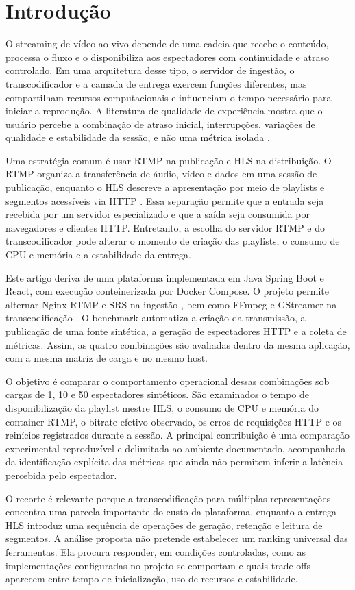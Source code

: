 \section{Introdução}

O streaming de vídeo ao vivo depende de uma cadeia que recebe o conteúdo, processa o fluxo e o disponibiliza aos espectadores com continuidade e atraso controlado. Em uma arquitetura desse tipo, o servidor de ingestão, o transcodificador e a camada de entrega exercem funções diferentes, mas compartilham recursos computacionais e influenciam o tempo necessário para iniciar a reprodução. A literatura de qualidade de experiência mostra que o usuário percebe a combinação de atraso inicial, interrupções, variações de qualidade e estabilidade da sessão, e não uma métrica isolada \citep{seufert,barman,rfc9317}.

Uma estratégia comum é usar RTMP na publicação e HLS na distribuição. O RTMP organiza a transferência de áudio, vídeo e dados em uma sessão de publicação, enquanto o HLS descreve a apresentação por meio de playlists e segmentos acessíveis via HTTP \citep{rtmp,hls}. Essa separação permite que a entrada seja recebida por um servidor especializado e que a saída seja consumida por navegadores e clientes HTTP. Entretanto, a escolha do servidor RTMP e do transcodificador pode alterar o momento de criação das playlists, o consumo de CPU e memória e a estabilidade da entrega.

Este artigo deriva de uma plataforma implementada em Java Spring Boot e React, com execução conteinerizada por Docker Compose. O projeto permite alternar Nginx-RTMP e SRS na ingestão \citep{nginxrtmp,srs}, bem como FFmpeg e GStreamer na transcodificação \citep{ffmpeg,gstreamer}. O benchmark automatiza a criação da transmissão, a publicação de uma fonte sintética, a geração de espectadores HTTP e a coleta de métricas. Assim, as quatro combinações são avaliadas dentro da mesma aplicação, com a mesma matriz de carga e no mesmo host.

O objetivo é comparar o comportamento operacional dessas combinações sob cargas de 1, 10 e 50 espectadores sintéticos. São examinados o tempo de disponibilização da playlist mestre HLS, o consumo de CPU e memória do container RTMP, o bitrate efetivo observado, os erros de requisições HTTP e os reinícios registrados durante a sessão. A principal contribuição é uma comparação experimental reproduzível e delimitada ao ambiente documentado, acompanhada da identificação explícita das métricas que ainda não permitem inferir a latência percebida pelo espectador.

O recorte é relevante porque a transcodificação para múltiplas representações concentra uma parcela importante do custo da plataforma, enquanto a entrega HLS introduz uma sequência de operações de geração, retenção e leitura de segmentos. A análise proposta não pretende estabelecer um ranking universal das ferramentas. Ela procura responder, em condições controladas, como as implementações configuradas no projeto se comportam e quais trade-offs aparecem entre tempo de inicialização, uso de recursos e estabilidade.

